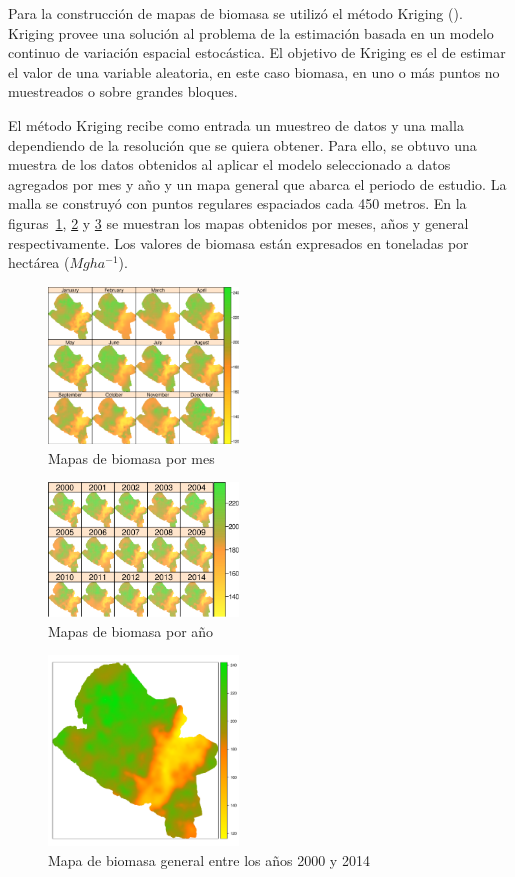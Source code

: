 Para la construcción de mapas de biomasa se utilizó el método Kriging (\cite{bivand_applied_2013, cressie_statistics_2015}).  Kriging provee una solución al problema de la estimación basada en un modelo continuo de variación espacial estocástica.  El objetivo de Kriging es el de estimar el valor de una variable aleatoria, en este caso biomasa, en uno o más puntos no muestreados o sobre grandes bloques. 

El método Kriging recibe como entrada un muestreo de datos y una malla dependiendo de la resolución que se quiera obtener. Para ello, se obtuvo una muestra de los datos obtenidos al aplicar el modelo seleccionado a datos agregados por mes y año y un mapa general que abarca el periodo de estudio.  La malla se construyó con puntos regulares espaciados cada 450 metros. En la figuras~\ref{fig:biomasaMes},  \ref{fig:biomasaAnio} y \ref{fig:biomasaTotal}  se muestran los mapas obtenidos por meses, años y general respectivamente. Los valores de biomasa están expresados en toneladas por hectárea ($Mg ha^{−1}$).
 
\begin{figure}
  \centering
  \includegraphics[width = 0.45\textwidth]{mapMonthsBiomass.pdf}
  \caption{Mapas de biomasa por mes}
  \label{fig:biomasaMes}
\end{figure}

\begin{figure}
  \centering
  \includegraphics[width = 0.45\textwidth]{mapYearsBiomass.pdf}
  \caption{Mapas de biomasa por año}
  \label{fig:biomasaAnio}
\end{figure}

\begin{figure}
  \centering
  \includegraphics[width = 0.45\textwidth]{mapGeneralBiomass.pdf}
  \caption{Mapa de biomasa general entre los años 2000 y 2014}
  \label{fig:biomasaTotal}
\end{figure}
